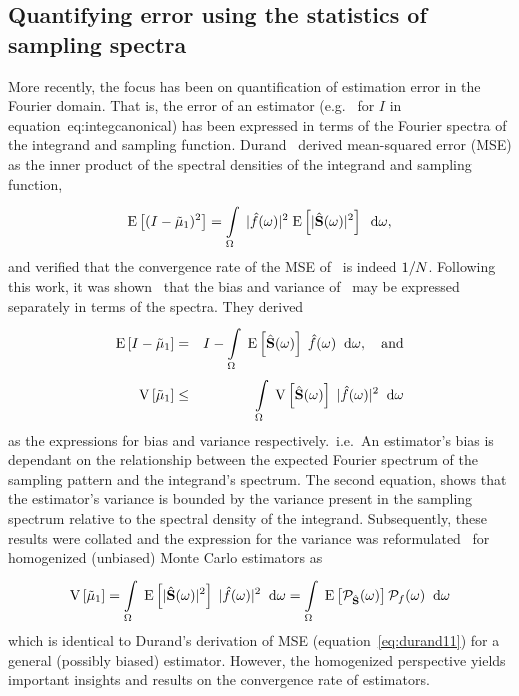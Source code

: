 \subsection{Quantifying error using the statistics of sampling spectra}
More recently, the focus has been on quantification of estimation error in the Fourier domain. That is, the error of an estimator (e.g.~ for $I$ in equation~{eq:integcanonical}) has been expressed in terms of the Fourier spectra of the integrand and sampling function. 
Durand~\cite{durand2011frequency} derived mean-squared error (MSE) as the inner product of the spectral densities of the integrand and sampling function, 
\begin{equation} \label{eq:durand11}
   \mathrm{E} \left[(I-\tilde\mu_\mathrm{1})^2 \right] = \displaystyle\int\limits_{\Omega}^{} \; |\hat{f}(\omega)|^2 \; \mathrm{E} \left[|\hat{\mathbf{S}}(\omega)|^2 \right] \;\; \mathrm{d}\omega,
\end{equation}
and verified that the convergence rate of the MSE of \estim{\N}\ is indeed $1/N$. Following this work, it was shown~\cite{Subr:2013:FAS} that the bias and variance of \ may be expressed separately in terms of the spectra. They derived
\begin{eqnarray}
  \mathrm{E} \left[I-\tilde\mu_\mathrm{1} \right] &=& I - \displaystyle\int\limits_{\Omega}^{} \; \mathrm{E} \left[\hat{\mathbf{S}}(\omega) \right] \; \hat{f}(\omega)  \;\; \mathrm{d}\omega, \quad \mathrm{and} \\
    \mathrm{V} \left[\tilde\mu_\mathrm{1}\right] &\leq& \displaystyle\int\limits_{\Omega}^{} \; \mathrm{V} \left[\hat{\mathbf{S}}(\omega)\right] \; |\hat{f}(\omega)|^2 \;\; \mathrm{d}\omega
\end{eqnarray}
as the expressions for bias and variance respectively.~i.e.~An estimator's bias is dependant on the relationship between the expected Fourier spectrum of the sampling pattern and the integrand's spectrum. The second equation, shows that the estimator's variance is bounded by the variance present in the sampling spectrum relative to the spectral density of the integrand. Subsequently, these results were collated and the expression for the variance was reformulated~\cite{Pilleboue:2015:VAM} for homogenized (unbiased) Monte Carlo estimators as
%
\begin{equation} \label{eq:pillebouevar}
\mathrm{V} \left[\tilde\mu_\mathrm{1}\right] 
= \displaystyle\int\limits_{\Omega}^{} \; \mathrm{E} \left[|\hat{\mathbf{S}}(\omega)|^2 \right]\;|\hat{f}(\omega)|^2 \;\; \mathrm{d}\omega 
= \displaystyle\int\limits_{\Omega}^{} \; \mathrm{E} \left[\mathcal{P}_{\hat{\mathbf{S}}}(\omega) \right] \mathcal{P}_{f}(\omega) \;\; \mathrm{d}\omega 
\end{equation}
which is identical to Durand's derivation of MSE (equation~\ref{eq:durand11}) for a general (possibly biased)  estimator. However, the homogenized perspective yields important insights and results on the convergence rate of estimators. 
%

